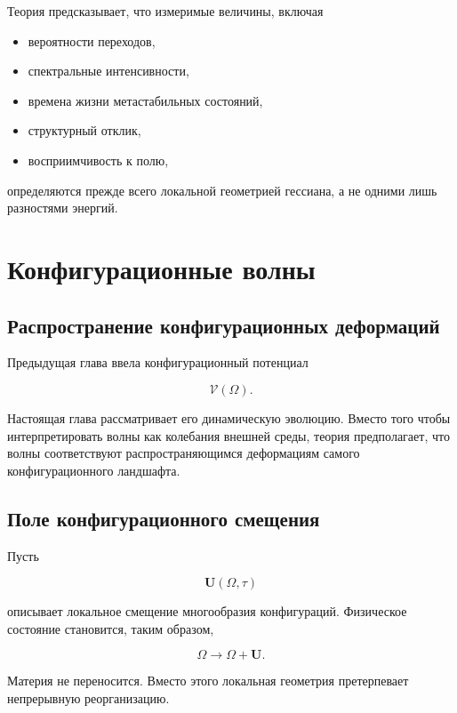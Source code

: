 Теория предсказывает, что измеримые величины, включая

\begin{itemize}

\item вероятности переходов,

\item спектральные интенсивности,

\item времена жизни метастабильных состояний,

\item структурный отклик,

\item восприимчивость к полю,

\end{itemize}

определяются прежде всего локальной геометрией гессиана, а не одними лишь разностями энергий.

\chapter{Конфигурационные волны}

\section{Распространение конфигурационных деформаций}

Предыдущая глава ввела конфигурационный потенциал

\[ \mathcal V(\Omega). \]

Настоящая глава рассматривает его динамическую эволюцию. Вместо того чтобы интерпретировать волны как колебания внешней среды, теория предполагает, что волны соответствуют распространяющимся деформациям самого конфигурационного ландшафта.

\section{Поле конфигурационного смещения}

Пусть

\[ \mathbf U(\Omega,\tau) \]

описывает локальное смещение многообразия конфигураций. Физическое состояние становится, таким образом,

\[ \boxed{ \Omega \rightarrow \Omega+\mathbf U. } \]

Материя не переносится. Вместо этого локальная геометрия претерпевает непрерывную реорганизацию.

